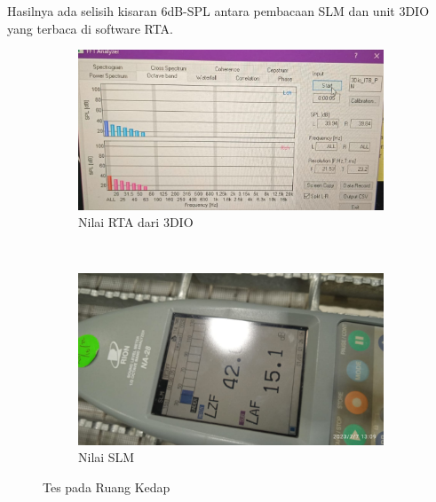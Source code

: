 \documentclass{article}
\begin{document}
	Hasilnya ada selisih kisaran 6dB-SPL antara pembacaan SLM dan unit 3DIO yang terbaca di software RTA.
	
	\begin{figure}[H]
		\centering
		\begin{subfigure}[]{.55\textwidth}
			\includegraphics[width=\textwidth]{images/tes_kedap_rta}
			\caption{Nilai RTA dari 3DIO}
		\end{subfigure}
		\\
		\begin{subfigure}[]{.55\textwidth}
			\includegraphics[width=\textwidth]{images/tes_kedap_slm}
			\caption{Nilai SLM}
		\end{subfigure}
		\caption{Tes pada Ruang Kedap}
	\end{figure}
\end{document}
